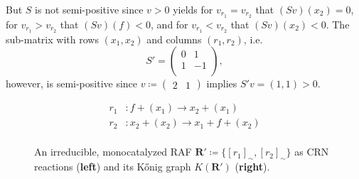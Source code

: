 \documentclass[pdflatex]{sn-jnl}
\theoremstyle{thmstyleone}%
\theoremstyle{examplesty}%
\theoremstyle{thmstylethree}%
\newcommand{\king}{K}
\newcommand{\SM}{S}
\newcommand{\RAF}[0]{\mathbf{R}'}
\begin{document}
{But $\SM$ is not semi-positive since $v>0$ yields for $v_{r_1}=v_{r_2}$ that $(\SM v)(x_2)=0$, for $v_{r_1}>v_{r_2}$ that $(\SM v)(f)<0$, and for $v_{r_1}<v_{r_2}$ that $(\SM v)(x_2)<0$. The sub-matrix with rows $(x_1,x_2)$ and columns $(r_1, r_2)$, i.e. 
\begin{equation}
	\SM'=\begin{pmatrix}
		0 & 1 \\
		1 & -1 \\
	\end{pmatrix},
\end{equation}
however, is semi-positive since $v\coloneqq 
\begin{pmatrix}
 	2 & 1
 \end{pmatrix}$ implies $\SM'v = (1,1)>0$.}
\begin{figure}[htb]
	\centering
	\begin{minipage}[c]{0.5\textwidth}
		\centering
		\begin{equation}
			\begin{split}
				r_1&: f + (x_1) \rightarrow x_2 + (x_1) \\[0.5em]
				r_2&: x_2 + (x_2) \rightarrow x_1 + f + (x_2) \\[0.5em]
			\end{split}
		\end{equation}		
	\end{minipage}%
	\hfill%
	\begin{minipage}[c]{0.5\textwidth}
		\centering
	\end{minipage}
	\par\bigskip
	\caption{An irreducible, monocatalyzed RAF $\RAF\coloneqq \{[r_1]_{\sim},[r_2]_{\sim}\}$ as CRN reactions (\textbf{left}) and its K\H{o}nig graph $\king(\RAF)$ (\textbf{right}). }
	\label{fig:foodBlock}
\end{figure}
\end{document}
